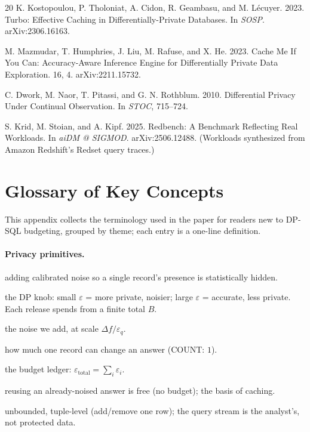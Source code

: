 \documentclass[sigconf,nonacm]{acmart}
\newcommand{\eps}{\varepsilon}
\begin{document}
\begin{thebibliography}{20}
K. Kostopoulou, P. Tholoniat, A. Cidon, R. Geambasu, and M. L\'ecuyer. 2023.
\newblock Turbo: Effective Caching in Differentially-Private Databases.
\newblock In {\em SOSP}. arXiv:2306.16163.

M. Mazmudar, T. Humphries, J. Liu, M. Rafuse, and X. He. 2023.
\newblock Cache Me If You Can: Accuracy-Aware Inference Engine for Differentially Private Data Exploration.
 16, 4. arXiv:2211.15732.

C. Dwork, M. Naor, T. Pitassi, and G. N. Rothblum. 2010.
\newblock Differential Privacy Under Continual Observation.
\newblock In {\em STOC}, 715--724.

S. Krid, M. Stoian, and A. Kipf. 2025.
\newblock Redbench: A Benchmark Reflecting Real Workloads.
\newblock In {\em aiDM @ SIGMOD}. arXiv:2506.12488. (Workloads synthesized from Amazon Redshift's Redset query traces.)

\end{thebibliography}

\appendix

\section{Glossary of Key Concepts}
\label{app:glossary}
This appendix collects the terminology used in the paper for readers new to DP-SQL budgeting, grouped by theme; each entry is a one-line definition.

\paragraph{Privacy primitives.}
\begin{description}\itemsep1pt \parskip0pt
\item[Differential privacy (DP)] adding calibrated noise so a single record's presence is statistically hidden.
\item[Privacy budget $\eps$] the DP knob: small $\eps$ = more private, noisier; large $\eps$ = accurate, less private. Each release spends from a finite total $B$.
\item[Laplace mechanism] the noise we add, at scale $\Delta f/\eps_q$.
\item[Sensitivity $\Delta f$] how much one record can change an answer (COUNT: $1$).
\item[Sequential composition] the budget ledger: $\eps_{\mathrm{total}}=\sum_i \eps_i$.
\item[Post-processing] reusing an already-noised answer is free (no budget); the basis of caching.
\item[Threat model] unbounded, tuple-level (add/remove one row); the query stream is the analyst's, not protected data.
\end{description}
\end{document}
